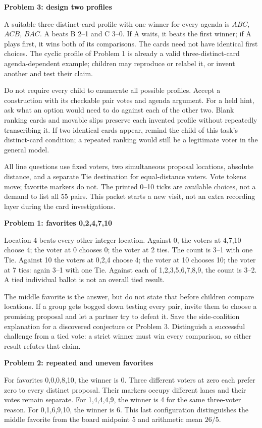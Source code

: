 \documentclass[11pt,letterpaper]{article}
\newcommand{\heading}[1]{\par\vspace{4pt}{\large\bfseries #1}\par}
\newcommand{\sub}[1]{\par\textbf{#1}\par}
\begin{document}
\sub{Problem 3: design two profiles}
A suitable three-distinct-card profile with one winner for every agenda is $ABC$, $ACB$, $BAC$. A beats B 2--1 and C 3--0. If A waits, it beats the first winner; if A plays first, it wins both of its comparisons. The cards need not have identical first choices. The cyclic profile of Problem 1 is already a valid three-distinct-card agenda-dependent example; children may reproduce or relabel it, or invent another and test their claim.

Do not require every child to enumerate all possible profiles. Accept a construction with its checkable pair votes and agenda argument. For a held hint, ask what an option would need to do against each of the other two. Blank ranking cards and movable slips preserve each invented profile without repeatedly transcribing it. If two identical cards appear, remind the child of this task's distinct-card condition; a repeated ranking would still be a legitimate voter in the general model.
\newpage
\heading{Line packet: a winner among locations}
All line questions use fixed voters, two simultaneous proposal locations, absolute distance, and a separate Tie destination for equal-distance voters. Vote tokens move; favorite markers do not. The printed 0--10 ticks are available choices, not a demand to list all 55 pairs. This packet starts a new visit, not an extra recording layer during the card investigations.

\sub{Problem 1: favorites 0,2,4,7,10}
Location 4 beats every other integer location. Against 0, the voters at 4,7,10 choose 4; the voter at 0 chooses 0; the voter at 2 ties. The count is 3--1 with one Tie. Against 10 the voters at 0,2,4 choose 4; the voter at 10 chooses 10; the voter at 7 ties: again 3--1 with one Tie. Against each of 1,2,3,5,6,7,8,9, the count is 3--2. A tied individual ballot is not an overall tied result.

The middle favorite is the answer, but do not state that before children compare locations. If a group gets bogged down testing every pair, invite them to choose a promising proposal and let a partner try to defeat it. Save the side-coalition explanation for a discovered conjecture or Problem 3. Distinguish a successful challenge from a tied vote: a strict winner must win every comparison, so either result refutes that claim.

\sub{Problem 2: repeated and uneven favorites}
For favorites 0,0,0,8,10, the winner is 0. Three different voters at zero each prefer zero to every distinct proposal. Their markers occupy different lanes and their votes remain separate. For 1,4,4,4,9, the winner is 4 for the same three-voter reason. For 0,1,6,9,10, the winner is 6. This last configuration distinguishes the middle favorite from the board midpoint 5 and arithmetic mean $26/5$.
\end{document}
